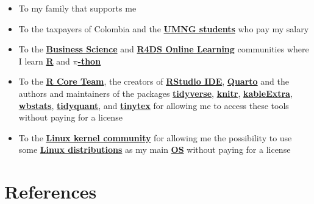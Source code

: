 \documentclass[
  ignorenonframetext,
]{beamer}
\begin{document}
\begin{frame}{}
\label{section-21}
\begin{itemize}
\item
  To my family that supports me
\item
  To the taxpayers of Colombia and the
  \href{https://www.umng.edu.co/estudiante}{\textbf{UMNG students}} who
  pay my salary
\item
  To the \href{https://www.business-science.io/}{\textbf{Business
  Science}} and \href{https://www.rfordatasci.com/}{\textbf{R4DS Online
  Learning}} communities where I learn
  \href{https://www.r-project.org/about.html}{\textbf{R}} and
  \href{https://www.python.org/about/}{\textbf{\(\pi\)-thon}}
\item
  To the \href{https://www.r-project.org/contributors.html}{\textbf{R
  Core Team}}, the creators of
  \href{https://rstudio.com/products/rstudio/}{\textbf{RStudio IDE}},
  \href{https://quarto.org/}{\textbf{Quarto}} and the authors and
  maintainers of the packages
  \href{https://CRAN.R-project.org/package=tidyverse}{\textbf{tidyverse}},
  \href{https://CRAN.R-project.org/package=knitr}{\textbf{knitr}},
  \href{https://CRAN.R-project.org/package=kableExtra}{\textbf{kableExtra}},
  \href{https://CRAN.R-project.org/package=wbstats}{\textbf{wbstats}},
  \href{https://CRAN.R-project.org/package=tidyquant}{\textbf{tidyquant}},
  and
  \href{https://CRAN.R-project.org/package=tinytex}{\textbf{tinytex}}
  for allowing me to access these tools without paying for a license
\item
  To the \href{https://www.kernel.org/category/about.html}{\textbf{Linux
  kernel community}} for allowing me the possibility to use some
  \href{https://static.lwn.net/Distributions/}{\textbf{Linux
  distributions}} as my main
  \href{https://en.wikipedia.org/wiki/Operating_system}{\textbf{OS}}
  without paying for a license
\end{itemize}
\end{frame}

\section*{References}\label{references}
\end{document}

